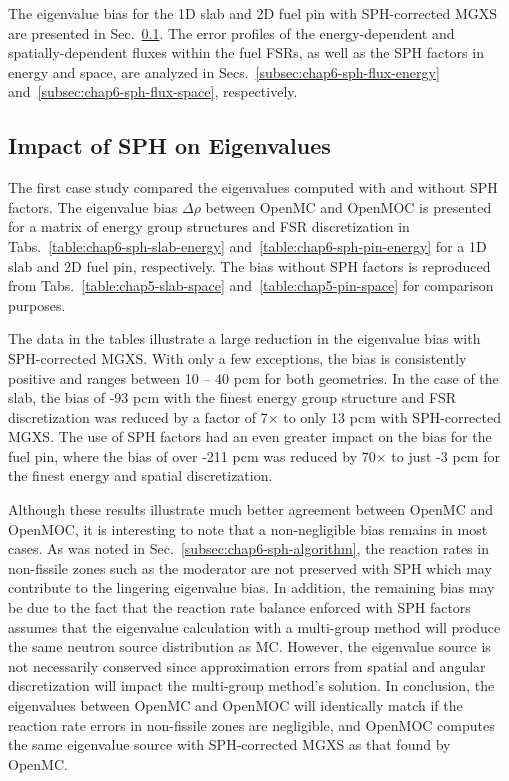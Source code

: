 The eigenvalue bias for the 1D slab and 2D fuel pin with \ac{SPH}-corrected \ac{MGXS} are presented in Sec.~\ref{subsubsec:chap6-sph-eigenvalues}. The error profiles of the energy-dependent and spatially-dependent fluxes within the fuel \ac{FSR}s, as well as the \ac{SPH} factors in energy and space, are analyzed in Secs.~\ref{subsec:chap6-sph-flux-energy} and~\ref{subsec:chap6-sph-flux-space}, respectively.

\subsection{Impact of SPH on Eigenvalues}
\label{subsubsec:chap6-sph-eigenvalues}

The first case study compared the eigenvalues computed with and without \ac{SPH} factors. The eigenvalue bias $\Delta\rho$ between OpenMC and OpenMOC is presented for a matrix of energy group structures and \ac{FSR} discretization in Tabs.~\ref{table:chap6-sph-slab-energy} and~\ref{table:chap6-sph-pin-energy} for a 1D slab and 2D fuel pin, respectively. The bias without \ac{SPH} factors is reproduced from Tabs.~\ref{table:chap5-slab-space} and~\ref{table:chap5-pin-space} for comparison purposes.

The data in the tables illustrate a large reduction in the eigenvalue bias with \ac{SPH}-corrected \ac{MGXS}. With only a few exceptions, the bias is consistently positive and ranges between 10 -- 40 \ac{pcm} for both geometries. In the case of the slab, the bias of -93 \ac{pcm} with the finest energy group structure and \ac{FSR} discretization was reduced by a factor of 7$\times$ to only 13 \ac{pcm} with \ac{SPH}-corrected \ac{MGXS}. The use of \ac{SPH} factors had an even greater impact on the bias for the fuel pin, where the bias of over -211 \ac{pcm} was reduced by 70$\times$ to just -3 \ac{pcm} for the finest energy and spatial discretization. 

Although these results illustrate much better agreement between OpenMC and OpenMOC, it is interesting to note that a non-negligible bias remains in most cases. As was noted in Sec.~\ref{subsec:chap6-sph-algorithm}, the reaction rates in non-fissile zones such as the moderator are not preserved with \ac{SPH} which may contribute to the lingering eigenvalue bias. In addition, the remaining bias may be due to the fact that the reaction rate balance enforced with \ac{SPH} factors assumes that the eigenvalue calculation with a multi-group method will produce the same neutron source distribution as \ac{MC}. However, the eigenvalue source is not necessarily conserved since approximation errors from spatial and angular discretization will impact the multi-group method's solution. In conclusion, the eigenvalues between OpenMC and OpenMOC will identically match if the reaction rate errors in non-fissile zones are negligible, and OpenMOC computes the same eigenvalue source with \ac{SPH}-corrected \ac{MGXS} as that found by OpenMC.

